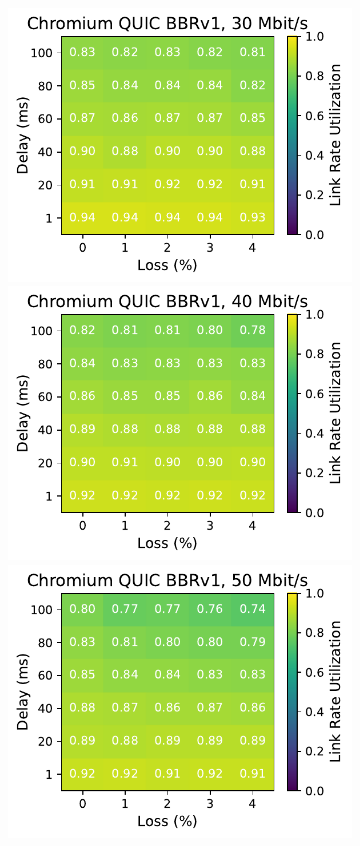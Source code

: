 \begin{figure}[ht]
\begin{subfigure}[b]{0.22\linewidth}
        \includegraphics[width=\linewidth,trim={0 0 2cm 0},clip]{figures/heatmaps/heatmap_quic_bbr1_30mbps.pdf}
        \includegraphics[width=\linewidth,trim={0 0 2cm 0},clip]{figures/heatmaps/heatmap_quic_bbr1_40mbps.pdf}
        \includegraphics[width=\linewidth,trim={0 0 2cm 0},clip]{figures/heatmaps/heatmap_quic_bbr1_50mbps.pdf}

\end{subfigure}
\end{figure}
